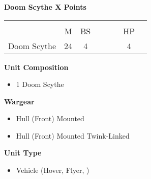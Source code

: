 \subsubsection[Doom Scythe]{}
\hspace{0.5em}
\begin{minipage}[t]{0.72\textwidth}
	{\large \textbf{Doom Scythe \dotfill X Points}}
	\begin{NiceTabular}{m{145 pt} *{2}{c} | *{3}{c} | c | c }
		& & &  & & & &  \\
		& M & BS &  &  &  & HP &  \\
		\hline
		Doom Scythe & 24 & 4 &  &  &  & 4 & \\
	\end{NiceTabular}
	\small
	\begin{minipage}[t]{0.5\textwidth}
		\begin{flushleft}
			\vspace*{2em}
			\textbf{Unit Composition}
			\begin{itemize}
				\item 1 Doom Scythe
			\end{itemize}
			
			\textbf{Wargear}
			\begin{itemize}
				\item Hull (Front) Mounted 
				\item Hull (Front) Mounted Twink-Linked 
			\end{itemize}
		\end{flushleft}
	\end{minipage}
	\begin{minipage}[t]{0.5\textwidth}
		\begin{flushleft}
			\vspace*{2em}
			\textbf{Unit Type}
			\begin{itemize}
				\item Vehicle (Hover, Flyer, \quickref{Living Metal})
			\end{itemize}
			

\end{flushleft}
\end{minipage}
\end{minipage}
